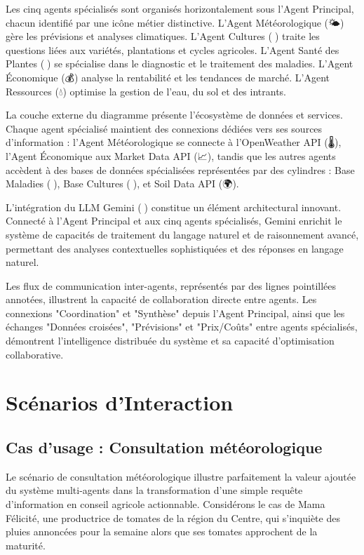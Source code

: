Les cinq agents spécialisés sont organisés horizontalement sous l'Agent Principal, chacun identifié par une icône métier distinctive. L'Agent Météorologique (🌤️) gère les prévisions et analyses climatiques. L'Agent Cultures (🌱) traite les questions liées aux variétés, plantations et cycles agricoles. L'Agent Santé des Plantes (🔬) se spécialise dans le diagnostic et le traitement des maladies. L'Agent Économique (💰) analyse la rentabilité et les tendances de marché. L'Agent Ressources (💧) optimise la gestion de l'eau, du sol et des intrants.

La couche externe du diagramme présente l'écosystème de données et services. Chaque agent spécialisé maintient des connexions dédiées vers ses sources d'information : l'Agent Météorologique se connecte à l'OpenWeather API (🌡️), l'Agent Économique aux Market Data API (📈), tandis que les autres agents accèdent à des bases de données spécialisées représentées par des cylindres : Base Maladies (🌿), Base Cultures (🌾), et Soil Data API (🌍).

L'intégration du LLM Gemini (🧠) constitue un élément architectural innovant. Connecté à l'Agent Principal et aux cinq agents spécialisés, Gemini enrichit le système de capacités de traitement du langage naturel et de raisonnement avancé, permettant des analyses contextuelles sophistiquées et des réponses en langage naturel.

Les flux de communication inter-agents, représentés par des lignes pointillées annotées, illustrent la capacité de collaboration directe entre agents. Les connexions "Coordination" et "Synthèse" depuis l'Agent Principal, ainsi que les échanges "Données croisées", "Prévisions" et "Prix/Coûts" entre agents spécialisés, démontrent l'intelligence distribuée du système et sa capacité d'optimisation collaborative.


\section{Scénarios d'Interaction}

\subsection{Cas d'usage : Consultation météorologique}

Le scénario de consultation météorologique illustre parfaitement la valeur ajoutée du système multi-agents dans la transformation d'une simple requête d'information en conseil agricole actionnable. Considérons le cas de Mama Félicité, une productrice de tomates de la région du Centre, qui s'inquiète des pluies annoncées pour la semaine alors que ses tomates approchent de la maturité.

